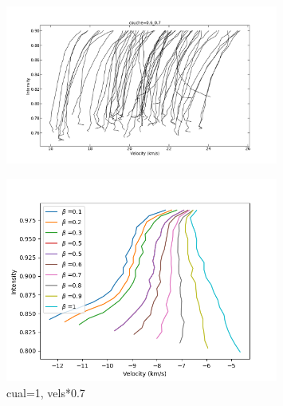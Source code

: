 \documentclass{/Users/art2/TeX/aanda/aa}
\def\kms {km\,s$^{-1}$}
\begin{document}
   \begin{figure}
      \includegraphics[width=0.8\textwidth]{bissecteurcouche06_07.png}
      \caption{ }
      \label{couche6}
      \end{figure}
   

\begin{figure}
   \includegraphics[width=0.8\textwidth]{Bisectors_cual1.png}
   \caption{ }
   \caption{cual=1, vels*0.7}
   \label{bisector1}
   \end{figure}
\end{document}
